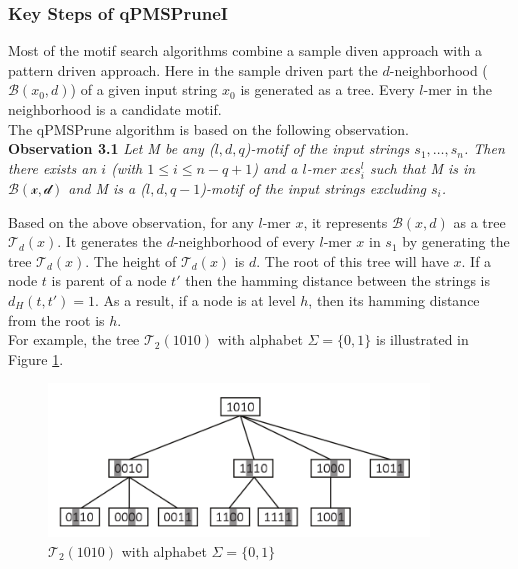 \subsubsection{Key Steps of qPMSPruneI}
Most of the motif search algorithms combine a sample diven approach with a pattern driven approach. Here in the sample driven part the $d$-neighborhood ($\mathcal{B}(x_0,d)$) of a given input string $x_0$ is generated as a tree. Every $l$-mer in the neighborhood is a candidate motif. \\

The qPMSPrune algorithm is based on the following observation.\\

\textbf{Observation 3.1} \textit{Let M be any ($l,d,q$)-motif of the input strings $s_1,\dots,s_n$. Then there exists an $i$ (with $1\leq i\leq n-q+1$) and a $l$-mer $x\epsilon s_i^l$ such that M is in $\mathcal{B(x,d)}$ and M is a ($l,d,q-1$)-motif of the input strings excluding $s_i$.}

Based on the above observation, for any $l$-mer $x$, it represents $\mathcal{B}(x,d)$ as a tree $\mathcal{T}_{d}(x)$. It generates the $d$-neighborhood of every $l$-mer $x$ in $s_1$ by generating the tree $\mathcal{T}_{d}(x)$. The height of $\mathcal{T}_{d}(x)$ is $d$. The root of this tree will have $x$. If a node $t$ is parent of a node $t'$ then the hamming distance between the strings is $d_{H}(t,t')=1$. As a result, if a node is at level $h$, then its hamming distance from the root is $h$.\\
For example, the tree $\mathcal{T}_{2}(1010)$ with alphabet $\Sigma=\{0,1\}$ is illustrated in Figure \cref{fig:pmsprunetree}.
\\

\begin{figure}[!tb]
	\centering
	\includegraphics[width=0.9\textwidth]{figures/pmsprunetree}
	\caption{$\mathcal{T}_{2}(1010)$ with alphabet $\Sigma =\{0,1\}$}
	\label{fig:pmsprunetree}
\end{figure}

